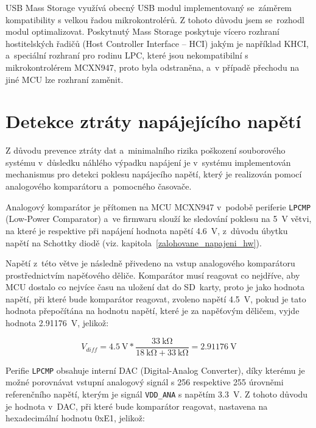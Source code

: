 USB Mass Storage využívá obecný USB modul implementovaný se~záměrem kompatibility s velkou řadou mikrokontrolérů. Z tohoto důvodu jsem se~rozhodl modul optimalizovat. Poskytnutý Mass Storage poskytuje vícero rozhraní hostitelských řadičů (Host Controller Interface -- HCI) jakým je například KHCI, a~speciální rozhraní pro rodinu LPC, které jsou nekompatibilní s mikrokontrolérem MCXN947, proto byla odstraněna, a~v případě přechodu na jiné MCU lze rozhraní zaměnit. 



\section{Detekce ztráty napájejícího napětí}
Z důvodu prevence ztráty dat a~minimalního rizika poškození souborového systému v~důsledku náhlého výpadku napájení je v~systému implementován mechanismus pro detekci poklesu napájecího napětí, který je realizován pomocí analogového komparátoru a~pomocného časovače.  

Analogový komparátor je přítomen na MCU MCXN947 v~podobě periferie \texttt{LPCMP} (Low-Power Comparator) a~ve firmwaru slouží ke sledování poklesu na \SI{5}{\volt} větvi, na které je respektive při napájení hodnota napětí \SI{4.6}{\volt}, z~důvodu úbytku napětí na Schottky diodě (viz. kapitola~\ref{zalohovane_napajeni_hw}).

\newpage


Napětí z~této větve je následně přivedeno na vstup analogového komparátoru prostřednictvím napěťového děliče. Komparátor musí reagovat co nejdříve, aby MCU dostalo co nejvíce času na uložení dat do SD~karty, proto je jako hodnota napětí, při které bude komparátor reagovat, zvoleno napětí \SI{4.5}{\volt}, pokud je tato hodnota přepočítána na hodnotu napětí, které je za napěťovým děličem, vyjde hodnota \SI{2.91176}{\volt}, jelikož:

\[
    V_{diff} = \SI{4.5}{\volt} * \frac{\SI{33}{\kilo\ohm}}{\SI{18}{\kilo\ohm} + \SI{33}{\kilo\ohm}} = \SI{2.91176}{\volt}
\]

Perifie \texttt{LPCMP} obsahuje interní DAC (Digital-Analog Converter), díky kterému je možné porovnávat vstupní analogový signál s 256 respektive 255 úrovněmi referenčního napětí, kterým je signál \texttt{VDD\_ANA} s napětím \SI{3.3}{\volt}. Z tohoto důvodu je hodnota v~DAC, při které bude komparátor reagovat, nastavena na hexadecimální hodnotu 0xE1, jelikož:

